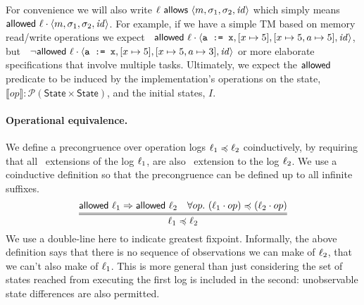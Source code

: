 \noindent
For convenience we will also write $\ell \textsf{ allows } \langle m, \sigma_1,
\sigma_2, \mathit{id}\rangle$ which simply means 
$\textsf{allowed}\ \ell \cdot \langle m, \sigma_1,\sigma_2, \mathit{id}\rangle$.
%
For example, if we have a simple TM
based on memory read/write operations we expect
$\;\;\textsf{allowed}\ \ell\cdot \langle \texttt{a := x}, [x \mapsto 5], [x
  \mapsto 5, a \mapsto 5], \mathit{id}\rangle$,
but 
$\;\;\neg \textsf{allowed}\ \ell\cdot \langle \texttt{a := x}, [x \mapsto 5], [x
  \mapsto 5, a \mapsto 3], \mathit{id}\rangle$ or more elaborate
specifications that involve multiple tasks.
%
Ultimately, we expect the $\textsf{allowed}\ $ predicate to be induced by the
implementation's operations on the state, $\llbracket op\rrbracket :
\mathcal{P}(\mathsf{State} \times \mathsf{State})$, and the initial
states, $I$. 

\paragraph{Operational equivalence.}
We define a precongruence over operation logs $\ell_1 \preccurlyeq \ell_2$
coinductively, by requiring that all \allowedt\ extensions of the log $\ell_1$, are also \allowedt\ extension to the log $\ell_2$. 
We use a coinductive definition so that the precongruence can be
defined up to all infinite suffixes.
$$
\infer={\OPL_1 \opeq \OPL_2} 
   {  \allowed{\OPL_1} \Rightarrow \allowed{\OPL_2}
     & \forall \op.\   (\OPL_1 \cdot \op) \opeq (\OPL_2 \cdot \op)}
$$
We use a double-line here to indicate greatest fixpoint.
%
Informally, the above definition says that 
there is no sequence of observations we can make of $\ell_2$, that we can't also make of $\ell_1$. 
This is more general than just considering the set of states reached from executing the first log is included in the second:
unobservable state differences are also permitted. 


